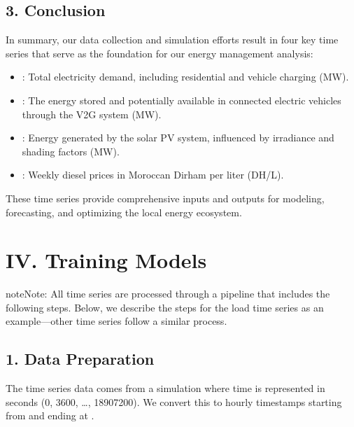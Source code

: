 \documentclass[letterpaper,10pt,english]{sphinxmanual}
\begin{document}
\section{3. Conclusion}
\label{\detokenize{index:conclusion}}
\sphinxAtStartPar
In summary, our data collection and simulation efforts result in four key time series that serve as the foundation for our energy management analysis:
\begin{itemize}
\item {} 
\sphinxAtStartPar
{}: Total electricity demand, including residential and vehicle charging (MW).

\item {} 
\sphinxAtStartPar
{}: The energy stored and potentially available in connected electric vehicles through the V2G system (MW).

\item {} 
\sphinxAtStartPar
{}: Energy generated by the solar PV system, influenced by irradiance and shading factors (MW).

\item {} 
\sphinxAtStartPar
{}: Weekly diesel prices in Moroccan Dirham per liter (DH/L).

\end{itemize}

\sphinxAtStartPar
These time series provide comprehensive inputs and outputs for modeling, forecasting, and optimizing the local energy ecosystem.


\chapter{IV. Training Models}
\label{\detokenize{index:iv-training-models}}
\begin{sphinxadmonition}{note}{Note:}
\sphinxAtStartPar
All time series are processed through a pipeline that includes the following steps.
Below, we describe the steps for the load time series as an example—other time series follow a similar process.
\end{sphinxadmonition}


\section{1. Data Preparation}
\label{\detokenize{index:data-preparation}}
\sphinxAtStartPar
The time series data comes from a simulation where time is represented in seconds (0, 3600, …, 18907200).
We convert this to hourly timestamps starting from  and ending at .
\end{document}
